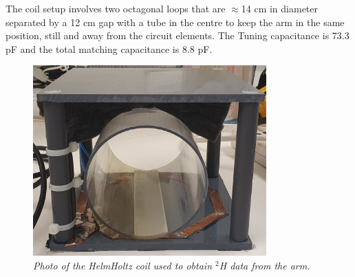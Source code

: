 \documentclass[class=article, crop=false]{standalone}
\begin{document}
The coil setup involves two octagonal loops that are $\approx$14 cm in diameter separated by a 12 cm gap with a tube in the centre to keep the arm in the same position, still and away from the circuit elements. The Tuning capacitance is 73.3 pF and the total matching capacitance is 8.8 pF.

\begin{figure}
    \centering
    \includegraphics[width=0.8\textwidth]{Figures/Theory/HelmHoltz_Coil.jpg}
    \caption{\textit{Photo of the HelmHoltz coil used to obtain $^2$H data from the arm.}}
    \label{fig:theory:HelmHoltz_pic}
\end{figure}

\end{document}
